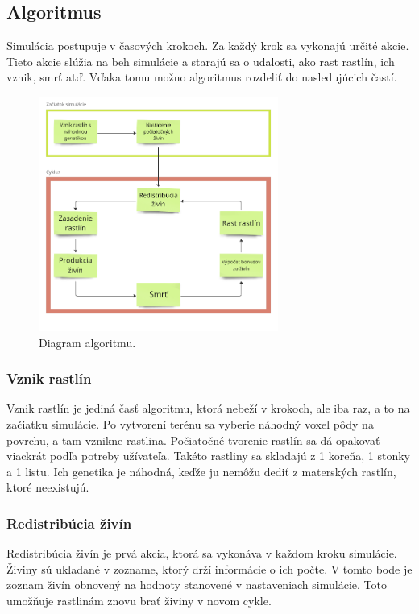 \documentclass[12pt]{article}
\begin{document}
\subsection{Algoritmus}

Simulácia postupuje v časových krokoch.
Za každý krok sa vykonajú určité akcie. Tieto akcie slúžia na beh
simulácie a starajú sa o udalosti, ako rast rastlín, ich vznik, smrť atď.
Vďaka tomu možno algoritmus rozdeliť do nasledujúcich častí.

\begin{figure}[ht]
	\centering
	\includegraphics[width=0.7\textwidth]{res/diagram_algoritmu.png}
	\caption{Diagram algoritmu.}
\end{figure}

\subsubsection{Vznik rastlín}

Vznik rastlín je jediná časť algoritmu, ktorá nebeží v krokoch, ale iba raz, a to na začiatku
simulácie. Po vytvorení terénu sa vyberie náhodný voxel pôdy na povrchu, a tam vznikne rastlina.
Počiatočné tvorenie rastlín sa dá opakovať viackrát podľa potreby užívateľa.
Takéto rastliny sa skladajú z 1 koreňa, 1 stonky a 1 listu.
Ich genetika je náhodná, keďže ju nemôžu dediť z materských rastlín, ktoré
neexistujú.

\subsubsection{Redistribúcia živín}

Redistribúcia živín je prvá akcia, ktorá sa vykonáva v každom kroku simulácie. Živiny sú
ukladané v zozname, ktorý drží informácie o ich počte.
V tomto bode je zoznam živín obnovený na hodnoty stanovené v nastaveniach simulácie.
Toto umožňuje rastlinám znovu brať živiny v novom cykle.
\end{document}
